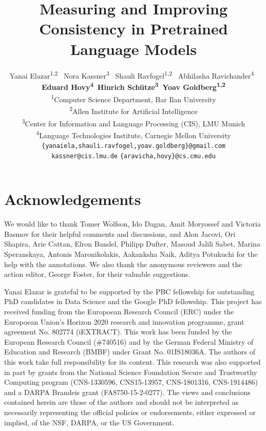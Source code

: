 \documentclass[11pt,a4paper]{article}
\title{Measuring and Improving Consistency in Pretrained Language Models}
\author{Yanai Elazar\textsuperscript{1,2} \,
 Nora Kassner\textsuperscript{3} \,
 Shauli Ravfogel\textsuperscript{1,2} \, 
 Abhilasha Ravichander\textsuperscript{4} \, \\
 {\bf Eduard Hovy\textsuperscript{4}\, 
 \bf Hinrich Sch\"utze\textsuperscript{3}\, 
 Yoav Goldberg\textsuperscript{1,2}}\\
\textsuperscript{1}Computer Science Department, Bar Ilan University \\
\textsuperscript{2}Allen Institute for Artificial Intelligence \\
\textsuperscript{3}Center for Information and Language Processing (CIS), LMU Munich\\
\textsuperscript{4}Language Technologies Institute, Carnegie Mellon University \\
  {\tt  \{yanaiela,shauli.ravfogel,yoav.goldberg\}@gmail.com}\\
  {\tt kassner@cis.lmu.de} 
  {\tt \{aravicha,hovy\}@cs.cmu.edu} 
  }
\date{}
\begin{document}
\maketitle

\begin{abstract}

\end{abstract}


% 












% 










\section*{Acknowledgements}
We would like to thank Tomer Wolfson, Ido Dagan, Amit Moryossef and Victoria Basmov for their helpful comments and discussions, and Alon Jacovi, Ori Shapira, Arie Cattan, Elron Bandel, Philipp Dufter, Masoud Jalili Sabet,  Marina Speranskaya, Antonis Maronikolakis, Aakanksha Naik, Aditya Potukuchi for the help with the annotations.
We also thank the anonymous reviewers and the action editor, George Foster, for their valuable suggestions.


Yanai Elazar is grateful to be supported by the PBC fellowship for outstanding PhD candidates in Data Science and the Google PhD fellowship.
This project has received funding from the Europoean Research Council (ERC) under the Europoean Union's Horizon 2020 research and innovation programme, grant agreement No. 802774 (iEXTRACT).
This work has been funded by the European Research Council (\#740516) and by the German Federal Ministry of Education
and Research (BMBF) under Grant No. 01IS18036A. The authors of this
work take full responsibility for its content. This research was also supported in part by grants from the National Science Foundation Secure and Trustworthy Computing program (CNS-1330596, CNS15-13957, CNS-1801316, CNS-1914486) and a DARPA Brandeis grant (FA8750-15-2-0277). The views and conclusions contained herein are those of the authors and should not be interpreted as necessarily representing the official policies or endorsements, either expressed or implied, of the NSF, DARPA, or the US Government.




\appendix


\end{document}
